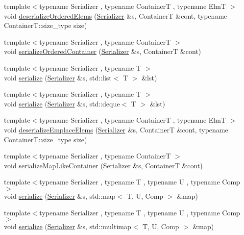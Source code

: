\begin{DoxyCompactItemize}
\item 
{\footnotesize template$<$typename Serializer , typename ContainerT , typename ElmT $>$ }\\void \hyperlink{namespacecheckpoint_a005f82d0e883e9568658492f18788fd0}{deserialize\+Ordered\+Elems} (\hyperlink{structcheckpoint_1_1_serializer}{Serializer} \&s, ContainerT \&cont, typename Container\+T\+::size\+\_\+type size)
\item 
{\footnotesize template$<$typename Serializer , typename ContainerT $>$ }\\void \hyperlink{namespacecheckpoint_a0b15edc50a881e06260e7112b2c60742}{serialize\+Ordered\+Container} (\hyperlink{structcheckpoint_1_1_serializer}{Serializer} \&s, ContainerT \&cont)
\item 
{\footnotesize template$<$typename Serializer , typename T $>$ }\\void \hyperlink{namespacecheckpoint_afb32627049eb840e4f8b9fd3022f2eb2}{serialize} (\hyperlink{structcheckpoint_1_1_serializer}{Serializer} \&s, std\+::list$<$ T $>$ \&lst)
\item 
{\footnotesize template$<$typename Serializer , typename T $>$ }\\void \hyperlink{namespacecheckpoint_a179b767294c9b23617f30fc4566d0be7}{serialize} (\hyperlink{structcheckpoint_1_1_serializer}{Serializer} \&s, std\+::deque$<$ T $>$ \&lst)
\item 
{\footnotesize template$<$typename Serializer , typename ContainerT , typename ElmT $>$ }\\void \hyperlink{namespacecheckpoint_a917aafbf9658a63360e4d5997a3e09ea}{deserialize\+Emplace\+Elems} (\hyperlink{structcheckpoint_1_1_serializer}{Serializer} \&s, ContainerT \&cont, typename Container\+T\+::size\+\_\+type size)
\item 
{\footnotesize template$<$typename Serializer , typename ContainerT $>$ }\\void \hyperlink{namespacecheckpoint_a99092baac18b33d03b1bb47ed1f2d7fa}{serialize\+Map\+Like\+Container} (\hyperlink{structcheckpoint_1_1_serializer}{Serializer} \&s, ContainerT \&cont)
\item 
{\footnotesize template$<$typename Serializer , typename T , typename U , typename Comp $>$ }\\void \hyperlink{namespacecheckpoint_a39ee0888319dc204dff7af20dd1e8238}{serialize} (\hyperlink{structcheckpoint_1_1_serializer}{Serializer} \&s, std\+::map$<$ T, U, Comp $>$ \&map)
\item 
{\footnotesize template$<$typename Serializer , typename T , typename U , typename Comp $>$ }\\void \hyperlink{namespacecheckpoint_a44434f578fc304afa3a62a9305be2a65}{serialize} (\hyperlink{structcheckpoint_1_1_serializer}{Serializer} \&s, std\+::multimap$<$ T, U, Comp $>$ \&map)

\end{DoxyCompactItemize}
